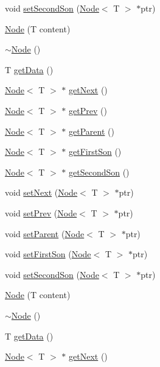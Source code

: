 \begin{DoxyCompactItemize}
void \hyperlink{class_node_a2611d6d8f96457b6b967176d1281eaa7}{set\+Second\+Son} (\hyperlink{class_node}{Node}$<$ T $>$ $\ast$ptr)
\item 
\hyperlink{class_node_ae84949b503d6e739e444b034cb4901e9}{Node} (T content)
\item 
\hyperlink{class_node_ae923d0417581dd19784d55b901f0f7f0}{$\sim$\+Node} ()
\item 
T \hyperlink{class_node_a0c3315ee2e897e2a6e1c24aeca20aeb9}{get\+Data} ()
\item 
\hyperlink{class_node}{Node}$<$ T $>$ $\ast$ \hyperlink{class_node_afd985b504e37f4f8d7342f58e6035238}{get\+Next} ()
\item 
\hyperlink{class_node}{Node}$<$ T $>$ $\ast$ \hyperlink{class_node_aab8224dbd6cf2c4b6df7b2920c802b8b}{get\+Prev} ()
\item 
\hyperlink{class_node}{Node}$<$ T $>$ $\ast$ \hyperlink{class_node_a1fe843bd1fa3267bcb2e587e36b55bbc}{get\+Parent} ()
\item 
\hyperlink{class_node}{Node}$<$ T $>$ $\ast$ \hyperlink{class_node_af04828ea7fd689f97336e5d3cebe3281}{get\+First\+Son} ()
\item 
\hyperlink{class_node}{Node}$<$ T $>$ $\ast$ \hyperlink{class_node_a995ceb51ab17cfdff11c6d5183118433}{get\+Second\+Son} ()
\item 
void \hyperlink{class_node_a23ae860653821e5059ada68d53ed5188}{set\+Next} (\hyperlink{class_node}{Node}$<$ T $>$ $\ast$ptr)
\item 
void \hyperlink{class_node_adc7682109a39cd7d91452c92f97a9c19}{set\+Prev} (\hyperlink{class_node}{Node}$<$ T $>$ $\ast$ptr)
\item 
void \hyperlink{class_node_a61f5675b13f5b836ca21adbee67eb91e}{set\+Parent} (\hyperlink{class_node}{Node}$<$ T $>$ $\ast$ptr)
\item 
void \hyperlink{class_node_a71c193658bfa572da23f8f136f7ffa73}{set\+First\+Son} (\hyperlink{class_node}{Node}$<$ T $>$ $\ast$ptr)
\item 
void \hyperlink{class_node_a2611d6d8f96457b6b967176d1281eaa7}{set\+Second\+Son} (\hyperlink{class_node}{Node}$<$ T $>$ $\ast$ptr)
\item 
\hyperlink{class_node_ae84949b503d6e739e444b034cb4901e9}{Node} (T content)
\item 
\hyperlink{class_node_ae923d0417581dd19784d55b901f0f7f0}{$\sim$\+Node} ()
\item 
T \hyperlink{class_node_a0c3315ee2e897e2a6e1c24aeca20aeb9}{get\+Data} ()
\item 
\hyperlink{class_node}{Node}$<$ T $>$ $\ast$ \hyperlink{class_node_afd985b504e37f4f8d7342f58e6035238}{get\+Next} ()

\end{DoxyCompactItemize}
